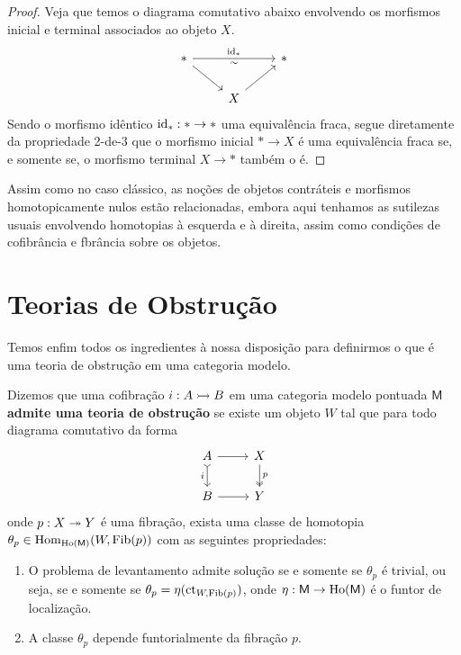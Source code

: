 \begin{proof}
  Veja que temos o diagrama comutativo abaixo envolvendo os morfismos inicial e terminal associados ao objeto $X$.
  \begin{displaymath}
    \begin{tikzcd}
      *
      \arrow[rr, "\id_{*}", "\sim" {swap}]
      \arrow[rd]
      & & *
      \\ & X
      \arrow[ru]
    \end{tikzcd}
  \end{displaymath}
  Sendo o morfismo idêntico $\mathrm{id}_{*}: * \to *$ uma equivalência fraca, segue diretamente da propriedade 2-de-3 que o morfismo inicial $* \to X$ é uma equivalência fraca se, e somente se, o morfismo terminal $X \to *$ também o é.
\end{proof}

Assim como no caso clássico, as noções de objetos contráteis e morfismos homotopicamente nulos estão relacionadas, embora aqui tenhamos as sutilezas usuais envolvendo homotopias à esquerda e à direita, assim como condições de cofibrância e fbrância sobre os objetos.

\section{Teorias de Obstrução}

Temos enfim todos os ingredientes à nossa disposição para definirmos o que é uma teoria de obstrução em uma categoria modelo.

\begin{defin}\label{defin:teoria_de_obstrucao}
  Dizemos que uma cofibração $i: A \rightarrowtail B$ em uma categoria modelo pontuada $\mathsf{M}$ \textbf{admite uma teoria de obstrução} se existe um objeto $W$ tal que para todo diagrama comutativo da forma
  \begin{displaymath}
    \begin{tikzcd}
      A
      \arrow[d, tail, "i" swap]
      \arrow[r]
      & X
      \arrow[d, two heads, "p"]
      \\ B
      \arrow[r]
      & Y
    \end{tikzcd}
  \end{displaymath}
  onde $p: X \twoheadrightarrow Y$ é uma fibração, exista uma classe de homotopia $\theta_{p}\in \mathrm{Hom}_{\mathrm{Ho}(\mathsf{M})}(W,\mathrm{Fib}(p))$ com as seguintes propriedades:
  \begin{enumerate}
  \item O problema de levantamento admite solução se e somente se $\theta_{p}$ é trivial, ou seja, se e somente se $\theta_{p} = \eta(\mathrm{ct}_{W,\mathrm{Fib}(p)})$, onde $\eta: \mathsf{M} \to \mathrm{Ho}(\mathsf{M})$ é o funtor de localização.
    
  \item A classe $\theta_{p}$ depende funtorialmente da fibração $p$.
  \end{enumerate}
\end{defin}

